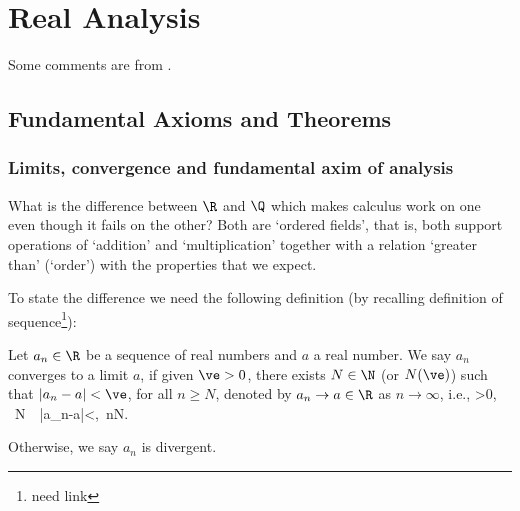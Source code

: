 \chapter{Real Analysis}

Some comments are from \cite{Tao_2006_1,Tao_2006_2}.

\section{Fundamental Axioms and Theorems}

\subsection{Limits, convergence and fundamental axim of analysis}

What is the difference between $\R$ and $\Q$ which makes calculus work on one even though it fails on the other? Both are `ordered fields', that is, both support operations of `addition' and `multiplication' together with a relation `greater than' (`order') with the properties that we expect.

To state the difference we need the following definition (by recalling definition of sequence\footnote{need link}):

\begin{definition}\label{def:convergence_limit_real}
Let $a_n\in\R$ be a sequence of real numbers and $a$ a real number. We say $a_n$ converges to a limit $a$, if given $\ve >0$, there exists $N\in \N$ (or $N(\ve)$) such that $|a_n-a|<\ve$, for all $n\geq N$, denoted by $a_n\to a\in \R$ as $n\to \infty$, i.e.,
\be
\forall \ve>0, \ \exists N\in \N\ \ |a_n-a|<\ve,\ \forall n\geq N.
\ee


Otherwise, we say $a_n$ is divergent.
\end{definition}

